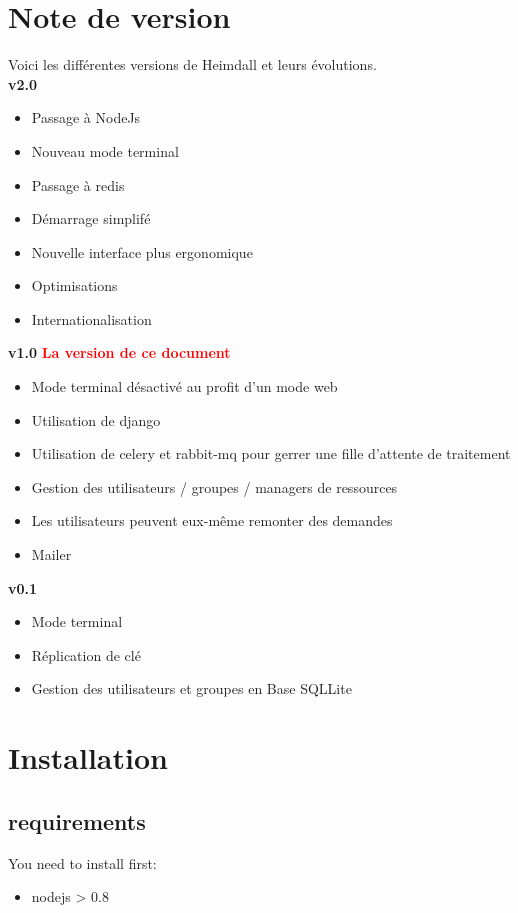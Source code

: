 \documentclass[11pt]{template}
\begin{document}
\section{Note de version}
Voici les différentes versions de Heimdall et leurs évolutions.
\vspace{8mm}\\
\textbf{v2.0}
\begin{itemize}[label=]
\item Passage à NodeJs
\item Nouveau mode terminal
\item Passage à redis
\item Démarrage simplifé
\item Nouvelle interface plus ergonomique
\item Optimisations
\item Internationalisation
\end{itemize}
\vspace{10mm}
\textbf{v1.0} \textbf{\textcolor{red}{La version de ce document}}
\begin{itemize}[label=]
\item Mode terminal désactivé au profit d'un mode web
\item Utilisation de django
\item Utilisation de celery et rabbit-mq pour gerrer une fille d'attente de traitement
\item Gestion des utilisateurs / groupes / managers de ressources
\item Les utilisateurs peuvent eux-même remonter des demandes
\item Mailer
\end{itemize}
\vspace{10mm}
\textbf{v0.1}
\begin{itemize}[label=]
\item Mode terminal
\item Réplication de clé
\item Gestion des utilisateurs et groupes en Base SQLLite
\end{itemize}

\newpage
\section{Installation}
\subsection{requirements}
You need to install first:
\begin{itemize}[label=]
\item nodejs > 0.8
\end{itemize}
\end{document}
